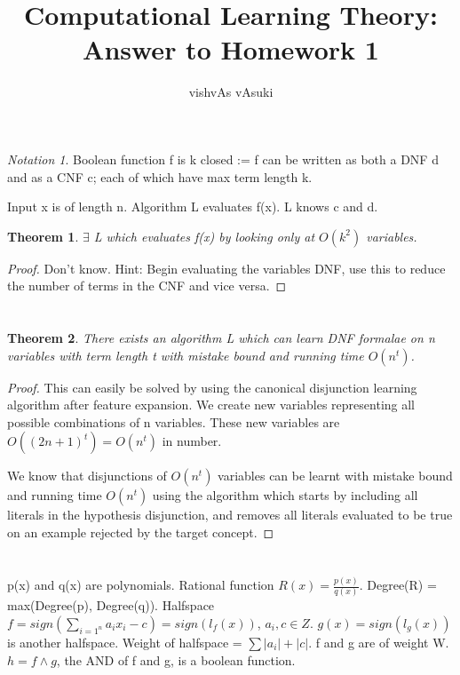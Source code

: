 \documentclass[10pt]{amsart}
\title{Computational Learning Theory: Answer to Homework 1}
\author{vishvAs vAsuki}
\newtheorem{thm}{Theorem}[subsection]
\theoremstyle{remark}
\newtheorem*{notation}{Notation}
\begin{document}
\maketitle

\section{}
\begin{notation}
Boolean function f is k closed := f can be written as both a DNF d and as a CNF c; each of which have max term length k.

Input x is of length n. Algorithm L evaluates f(x). L knows c and d.
\end{notation}

\begin{thm}
$\exists$ L which evaluates f(x) by looking only at $O(k^{2})$ variables.
\end{thm}
\begin{proof}
Don't know. Hint: Begin evaluating the variables DNF, use this to reduce the number of terms in the CNF and vice versa.
\end{proof}

\section{}
\begin{thm}
There exists an algorithm L which can learn DNF formalae on n variables with term length t with mistake bound and running time $O(n^{t})$.
\end{thm}
\begin{proof}
This can easily be solved by using the canonical disjunction learning algorithm after feature expansion. We create new variables representing all possible combinations of n variables. These new variables are $O((2n+1)^{t}) = O(n^{t})$ in number.

We know that disjunctions of $O(n^{t})$ variables can be learnt with mistake bound and running time $O(n^{t})$ using the algorithm which starts by including all literals in the hypothesis disjunction, and removes all literals evaluated to be true on an example rejected by the target concept.
\end{proof}

\section{}
p(x) and q(x) are polynomials. Rational function $R(x) = \frac{p(x)}{q(x)}$. Degree(R) = max(Degree(p), Degree(q)). Halfspace $f = sign(\sum_{i=1^{n}}a_{i}x_{i} - c) = sign(l_{f}(x))$, $a_{i}, c \in Z$. $g(x) = sign(l_{g}(x))$ is another halfspace. Weight of halfspace = $\sum |a_{i}| + |c|$. f and g are of weight W. $h = f \wedge g$, the AND of f and g, is a boolean function.
\end{document}
